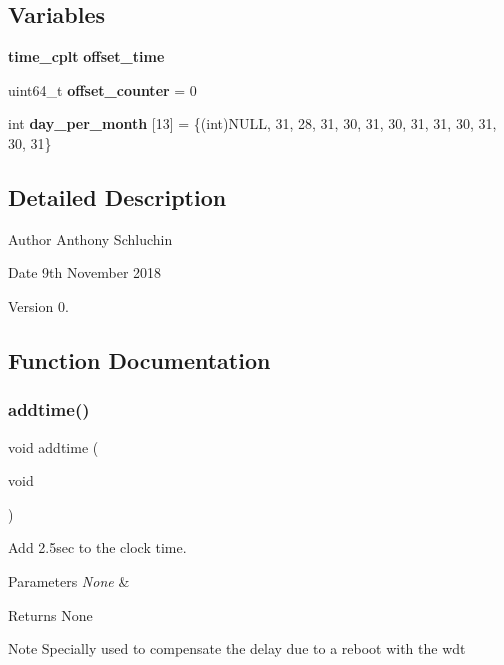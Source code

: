 \subsection*{Variables}
\begin{DoxyCompactItemize}
\item 
\textbf{ time\+\_\+cplt} {\bfseries offset\+\_\+time}
\item 
\mbox{\label{time__hm_8c_a22f0b78da4a8e0ce089319fff73f0259}} 
uint64\+\_\+t {\bfseries offset\+\_\+counter} = 0
\item 
\mbox{\label{time__hm_8c_a87787b8a65842028cd41e7c518b25d30}} 
int {\bfseries day\+\_\+per\+\_\+month} [13] = \{(int)N\+U\+LL, 31, 28, 31, 30, 31, 30, 31, 31, 30, 31, 30, 31\}
\end{DoxyCompactItemize}


\subsection{Detailed Description}
\begin{DoxyAuthor}{Author}
Anthony Schluchin 
\end{DoxyAuthor}
\begin{DoxyDate}{Date}
9th November 2018 
\end{DoxyDate}
\begin{DoxyVersion}{Version}
0. 
\end{DoxyVersion}


\subsection{Function Documentation}
\mbox{\label{time__hm_8c_a17ec1ac87ef501b1e19143e0a820b51d}} 
\subsubsection{addtime()}
{\footnotesize\ttfamily void addtime (\begin{DoxyParamCaption}\item[{void}]{ }\end{DoxyParamCaption})}



Add 2.\+5sec to the clock time. 


\begin{DoxyParams}{Parameters}
{\em None} & \\
\hline
\end{DoxyParams}
\begin{DoxyReturn}{Returns}
None
\end{DoxyReturn}
\begin{DoxyNote}{Note}
Specially used to compensate the delay due to a reboot with the wdt 
\end{DoxyNote}
\mbox{\label{time__hm_8c_af2f292a8abbb851c01a5f80843259242}} 
